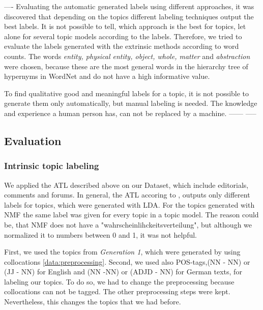 {----
Evaluating the automatic generated labels using different approaches, it was discovered that depending on the topics different labeling techniques output the best labels. It is not possible to tell, which approach is the best for topics, let alone for several topic models according to the labels. Therefore, we tried to evaluate the labels generated with the extrinsic methods according to word counts. The words \textit{entity, physical entity, object, whole, matter} and \textit{abstraction} were chosen, because these are the most general words in the hierarchy tree of hypernyms in WordNet and do not have a high informative value.

To find qualitative good and meaningful labels for a topic, it is not possible to generate them only automatically, but manual labeling is needed. The knowledge and experience a human person has, can not be replaced by a machine.
------
-----

\subsection{Evaluation}


\subsubsection{Intrinsic topic labeling}
We applied the \ac{ATL} described above on our Dataset, which include editorials, comments and forums. In general, the \ac{ATL} accoring to \cite{Mei2007}, outputs only different labels for topics, which were generated with \ac{LDA}. For the topics generated with \ac{NMF} the same label was given for every topic in a topic model. The reason could be, that \ac{NMF} does not have a "wahrscheinlihckeitsverteilung", but although we normalized it to numbers between 0 and 1, it was not helpful.

First, we used the topics from \textit{Generation 1}, which were generated by using collocations \ref{data:preprocessing}.
Second, we used also \ac{POS}-tags,(NN - NN) or (JJ - NN) for English and (NN -NN) or (ADJD - NN) for German texts, for labeling our topics. To do so, we had to change the preprocessing because collocations can not be tagged. The other preprocessing steps were kept. Nevertheless, this changes the topics that we had before. 

}
